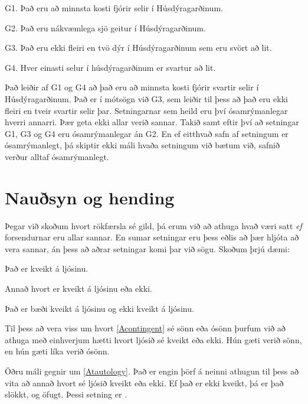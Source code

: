 	\label{MartianGiraffes}
	\begin{ebullet}
		\item[G1.] Það eru að minnsta kosti fjórir selir í Húsdýragarðinum.
		\item[G2.] Það eru nákvæmlega sjö geitur í Húsdýragarðinum.
		\item[G3.] Það eru ekki fleiri en tvö dýr í Húsdýragarðinum sem eru svört að lit.
		\item[G4.] Hver einasti selur í húsdýragarðinum er svartur að lit.
	\end{ebullet}
	Það leiðir af G1 og G4 að það eru að minnsta kosti fjórir svartir selir í Húsdýragarðinum. Það er í mótsögn við G3, sem leiðir til þess að það eru ekki fleiri en tveir svartir selir þar. Setningarnar sem heild eru því ósamrýmanlegar hverri annarri. Þær geta ekki allar verið sannar. Takið samt eftir því að setningar G1, G3 og G4 eru ósamrýmanlegar án G2. En ef eitthvað safn af setningum er ósamrýmanlegt, þá skiptir ekki máli hvaða setningum við bætum við, safnið verður alltaf ósamrýmanlegt.
	
\section{Nauðsyn og hending}

Þegar við skoðum hvort rökfærsla sé gild, þá erum við að athuga hvað væri satt \emph{ef} forsendurnar eru allar sannar. En sumar setningar eru þess eðlis að þær hljóta að vera sannar, án þess að aðrar setningar komi þar við sögu. Skoðum þrjú dæmi:

	\begin{earg}
		\item[\ex{Acontingent}] Það er kveikt á ljósinu.
		\item[\ex{Atautology}] Annað hvort er kveikt á ljósinu eða ekki.
		\item[\ex{Acontradiction}] Það er bæði kveikt á ljósinu og ekki kveikt á ljósinu.
	\end{earg}
	
Til þess að vera viss um hvort \ref{Acontingent} sé sönn eða ósönn þurfum við að athuga með einhverjum hætti hvort ljósið sé kveikt eða ekki. Hún gæti verið sönn, en hún gæti líka verið ósönn. 

Öðru máli gegnir um \ref{Atautology}. Það er engin þörf á neinni athugun til þess að vita að annað hvort sé ljósið kveikt eða ekki. Ef það er ekki kveikt, þá er það slökkt, og öfugt. Þessi setning er .

